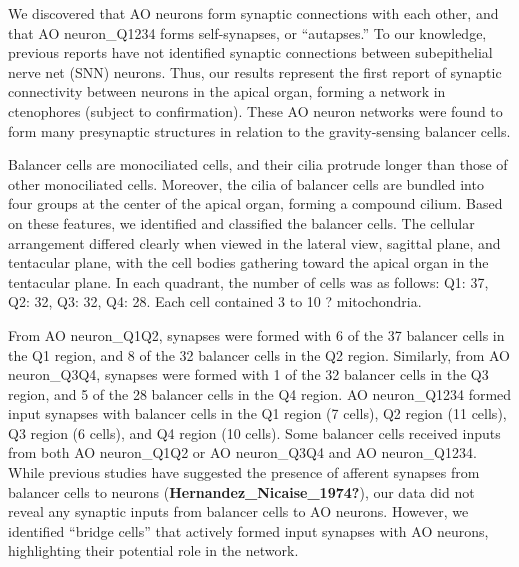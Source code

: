 \documentclass[
  11pt,
]{article}
\begin{document}
We discovered that AO neurons form synaptic connections with each other,
and that AO neuron\_Q1234 forms self-synapses, or ``autapses.'' To our
knowledge, previous reports have not identified synaptic connections
between subepithelial nerve net (SNN) neurons. Thus, our results
represent the first report of synaptic connectivity between neurons in
the apical organ, forming a network in ctenophores (subject to
confirmation). These AO neuron networks were found to form many
presynaptic structures in relation to the gravity-sensing balancer
cells.

Balancer cells are monociliated cells, and their cilia protrude longer
than those of other monociliated cells. Moreover, the cilia of balancer
cells are bundled into four groups at the center of the apical organ,
forming a compound cilium. Based on these features, we identified and
classified the balancer cells. The cellular arrangement differed clearly
when viewed in the lateral view, sagittal plane, and tentacular plane,
with the cell bodies gathering toward the apical organ in the tentacular
plane. In each quadrant, the number of cells was as follows: Q1: 37, Q2:
32, Q3: 32, Q4: 28. Each cell contained 3 to 10 ? mitochondria.

From AO neuron\_Q1Q2, synapses were formed with 6 of the 37 balancer
cells in the Q1 region, and 8 of the 32 balancer cells in the Q2 region.
Similarly, from AO neuron\_Q3Q4, synapses were formed with 1 of the 32
balancer cells in the Q3 region, and 5 of the 28 balancer cells in the
Q4 region. AO neuron\_Q1234 formed input synapses with balancer cells in
the Q1 region (7 cells), Q2 region (11 cells), Q3 region (6 cells), and
Q4 region (10 cells). Some balancer cells received inputs from both AO
neuron\_Q1Q2 or AO neuron\_Q3Q4 and AO neuron\_Q1234. While previous
studies have suggested the presence of afferent synapses from balancer
cells to neurons (\textbf{Hernandez\_Nicaise\_1974?}), our data did not
reveal any synaptic inputs from balancer cells to AO neurons. However,
we identified ``bridge cells'' that actively formed input synapses with
AO neurons, highlighting their potential role in the network.
\end{document}

